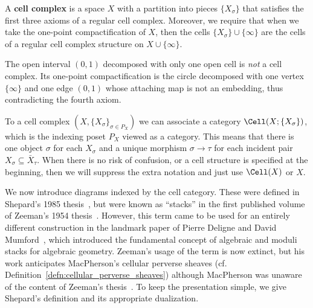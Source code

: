 \begin{defn}\label{defn:face_poset}
 A \textbf{cell complex} is a space $X$ with a partition into pieces $\{X_{\sigma}\}$ that satisfies the first three axioms of a regular cell complex. Moreover, we require that when we take the one-point compactification of $X$, then the cells $\{X_{\sigma}\}\cup \{\infty\}$ are the cells of a regular cell complex structure on $X\cup\{\infty\}$.
\end{defn}

\begin{ex}
 The open interval $(0,1)$ decomposed with only one open cell is \emph{not} a cell complex. Its one-point compactification is the circle decomposed with one vertex $\{\infty\}$ and one edge $(0,1)$ whose attaching map is not an embedding, thus contradicting the fourth axiom.
\end{ex}

\begin{defn}
 To a cell complex $(X,\{X_{\sigma}\}_{\sigma\in P_X})$ we can associate a category $\Cell(X;\{X_{\sigma}\})$, which is the indexing poset $P_X$ viewed as a category. This means that there is one object $\sigma$ for each $X_{\sigma}$ and a unique morphism $\sigma\to\tau$ for each incident pair $X_{\sigma}\subseteq \bar{X}_{\tau}$. When there is no risk of confusion, or a cell structure is specified at the beginning, then we will suppress the extra notation and just use $\Cell(X)$ or $X$.
\end{defn}

We now introduce diagrams indexed by the cell category. These were defined in Shepard's 1985 thesis~\cite[p.~6]{shepard}, but were known as ``stacks'' in the first published volume of Zeeman's 1954 thesis~\cite[p.~626]{dihom_1}. However, this term came to be used for an entirely different construction in the landmark paper of Pierre Deligne and David Mumford~\cite{DM-stacks}, which introduced the fundamental concept of algebraic and moduli stacks for algebraic geometry. Zeeman's usage of the term is now extinct, but his work anticipates MacPherson's cellular perverse sheaves (cf. Definition~\ref{defn:cellular_perverse_sheaves}) although MacPherson was unaware~\cite{macpherson} of the content of Zeeman's thesis~\cite{dihom_1,dihom_2,dihom_3}. To keep the presentation simple, we give Shepard's definition and its appropriate dualization.

